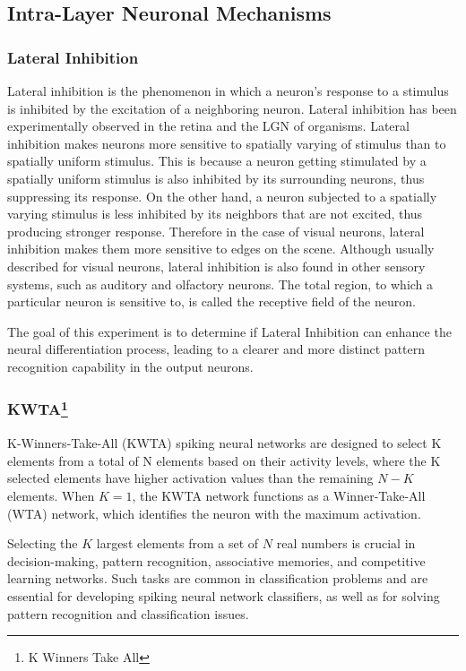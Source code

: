 \documentclass[12pt]{article}
\begin{document}
	\subsection{Intra-Layer Neuronal Mechanisms}
	
	\subsubsection{Lateral Inhibition}
	
	Lateral inhibition is the phenomenon in which a neuron's response to a stimulus is inhibited by the excitation of a neighboring neuron. Lateral inhibition has been experimentally observed in the retina and the LGN of organisms. Lateral inhibition makes neurons more sensitive to spatially varying of stimulus than to spatially uniform stimulus. This is because a neuron getting stimulated by a spatially uniform stimulus is also inhibited by its surrounding neurons, thus suppressing its response. On the other hand, a neuron subjected to a spatially varying stimulus is less inhibited by its neighbors that are not excited, thus producing stronger response. Therefore in the case of visual neurons, lateral inhibition makes them more sensitive to edges on the scene. Although usually described for visual neurons, lateral inhibition is also found in other sensory systems, such as auditory and olfactory neurons. The total region, to which a particular neuron is sensitive to, is called the receptive field of the neuron.

The goal of this experiment is to determine if Lateral Inhibition can enhance the neural differentiation process, leading to a clearer and more distinct pattern recognition capability in the output neurons.




\subsubsection[KWTA]{KWTA\footnote{K Winners Take All}}
	
K-Winners-Take-All (KWTA) spiking neural networks are designed to select K elements from a total of N elements based on their activity levels, where the K selected elements have higher activation values than the remaining $N-K$ elements. When $𝐾=1$, the KWTA network functions as a Winner-Take-All (WTA) network, which identifies the neuron with the maximum activation.

Selecting the $K$ largest elements from a set of $N$ real numbers is crucial in decision-making, pattern recognition, associative memories, and competitive learning networks. Such tasks are common in classification problems and are essential for developing spiking neural network classifiers, as well as for solving pattern recognition and classification issues.
\end{document}
